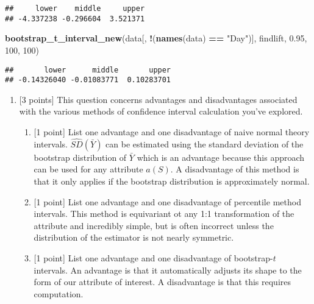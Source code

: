 \documentclass[
]{article}
\newenvironment{Shaded}{\begin{snugshade}}{\end{snugshade}}
\newcommand{\DecValTok}[1]{\textcolor[rgb]{0.00,0.00,0.81}{#1}}
\newcommand{\FloatTok}[1]{\textcolor[rgb]{0.00,0.00,0.81}{#1}}
\newcommand{\FunctionTok}[1]{\textcolor[rgb]{0.13,0.29,0.53}{\textbf{#1}}}
\newcommand{\NormalTok}[1]{#1}
\newcommand{\SpecialCharTok}[1]{\textcolor[rgb]{0.81,0.36,0.00}{\textbf{#1}}}
\newcommand{\StringTok}[1]{\textcolor[rgb]{0.31,0.60,0.02}{#1}}
\begin{document}
\begin{verbatim}
##     lower    middle     upper 
## -4.337238 -0.296604  3.521371
\end{verbatim}

\begin{Shaded}
\begin{Highlighting}[]
\FunctionTok{bootstrap\_t\_interval\_new}\NormalTok{(data[, }\SpecialCharTok{!}\NormalTok{(}\FunctionTok{names}\NormalTok{(data) }\SpecialCharTok{==} \StringTok{"Day"}\NormalTok{)], findlift, }\FloatTok{0.95}\NormalTok{, }\DecValTok{100}\NormalTok{, }\DecValTok{100}\NormalTok{)}
\end{Highlighting}
\end{Shaded}

\begin{verbatim}
##       lower      middle       upper 
## -0.14326040 -0.01083771  0.10283701
\end{verbatim}

\begin{enumerate}
\def\labelenumi{(\alph{enumi})}
\setcounter{enumi}{7}
\item
  {[}3 points{]} This question concerns advantages and disadvantages
  associated with the various methods of confidence interval calculation
  you've explored.

  \begin{enumerate}
  \def\labelenumii{\roman{enumii}.}
  \item
    {[}1 point{]} List one advantage and one disadvantage of naive
    normal theory intervals. \(\widehat{SD}(\bar{Y})\) can be estimated
    using the standard deviation of the bootstrap distribution of
    \(\bar{Y}\) which is an advantage because this approach can be used
    for any attribute \(a(S)\). A disadvantage of this method is that it
    only applies if the bootstrap distribution is approximately normal.
  \item
    {[}1 point{]} List one advantage and one disadvantage of percentile
    method intervals. This method is equivariant ot any 1:1
    transformation of the attribute and incredibly simple, but is often
    incorrect unless the distribution of the estimator is not nearly
    symmetric.
  \item
    {[}1 point{]} List one advantage and one disadvantage of
    bootstrap-\(t\) intervals. An advantage is that it automatically
    adjusts its shape to the form of our attribute of interest. A
    disadvantage is that this requires computation.
  \end{enumerate}
\end{enumerate}
\end{document}
